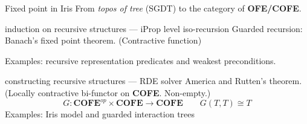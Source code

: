 \documentclass[8pt]{beamer}
\newcommand{\COFE}{\mathbf{COFE}}
\begin{document}
  \begin{frame}{Fixed point in Iris}
    From \emph{topos of tree} (SGDT) to the category of \textbf{OFE/COFE}.
    \begin{block}{induction on recursive structures --- iProp level iso-recursion}
      Guarded recursion: Banach's fixed point theorem. (Contractive function)
      Examples: recursive representation predicates and weakest preconditions.
    \end{block}
    \begin{block}{constructing recursive structures --- RDE solver}
      America and Rutten's theorem. (Locally contractive bi-functor on \textbf{COFE}. Non-empty.)
      \[
        G : \COFE^{op}\times \COFE \to \COFE
        \qquad
        G(T, T) \cong T
      \]
      Examples: Iris model and guarded interaction trees
    \end{block}
  \end{frame}
\end{document}
